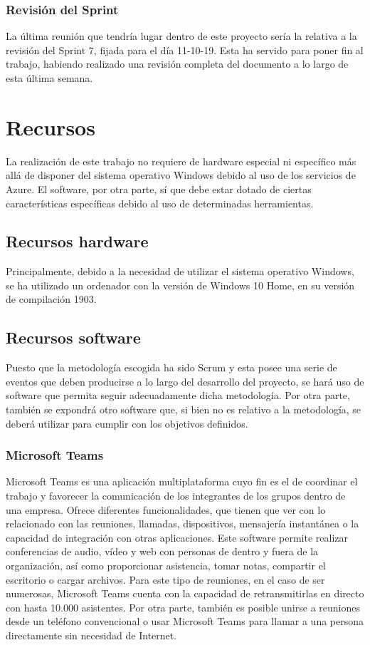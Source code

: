 \subsubsection{Revisión del Sprint}
La última reunión que tendría lugar dentro de este proyecto sería la relativa a la revisión del Sprint 7, fijada para el día 11-10-19. Esta ha servido para poner fin al trabajo, habiendo realizado una revisión completa del documento a lo largo de esta última semana.

\clearpage

\section{Recursos}
La realización de este trabajo no requiere de hardware especial ni específico más allá de disponer del sistema operativo Windows debido al uso de los servicios de Azure. El software, por otra parte, sí que debe estar dotado de ciertas características específicas debido al uso de determinadas herramientas.

\subsection{Recursos hardware}
Principalmente, debido a la necesidad de utilizar el sistema operativo Windows, se ha utilizado un ordenador con la versión de Windows 10 Home, en su versión de compilación 1903.

\subsection{Recursos software}
Puesto que la metodología escogida ha sido Scrum y esta posee una serie de eventos que deben producirse a lo largo del desarrollo del proyecto, se hará uso de software que permita seguir adecuadamente dicha metodología. Por otra parte, también se expondrá otro software que, si bien no es relativo a la metodología, se deberá utilizar para cumplir con los objetivos definidos.

\subsubsection{Microsoft Teams}
Microsoft Teams \cite{microsoftteams} es una aplicación multiplataforma cuyo fin es el de coordinar el trabajo y favorecer la comunicación de los integrantes de los grupos dentro de una empresa. Ofrece diferentes funcionalidades, que tienen que ver con lo relacionado con las reuniones, llamadas, dispositivos, mensajería instantánea o la capacidad de integración con otras aplicaciones. Este software permite realizar conferencias de audio, vídeo y web con personas de dentro y fuera de la organización, así como proporcionar asistencia, tomar notas, compartir el escritorio o cargar archivos. Para este tipo de reuniones, en el caso de ser numerosas, Microsoft Teams cuenta con la capacidad de retransmitirlas en directo con hasta 10.000 asistentes. Por otra parte, también es posible unirse a reuniones desde un teléfono convencional o usar Microsoft Teams para llamar a una persona directamente sin necesidad de Internet.

